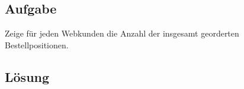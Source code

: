 \subsection{Aufgabe}
\label{sec:uebung_10.aufgabe_05}
Zeige für jeden Webkunden die Anzahl der insgesamt georderten Bestellpositionen.

\subsection*{Lösung}
\label{sec:uebung_10.aufgabe_05.loesung}
